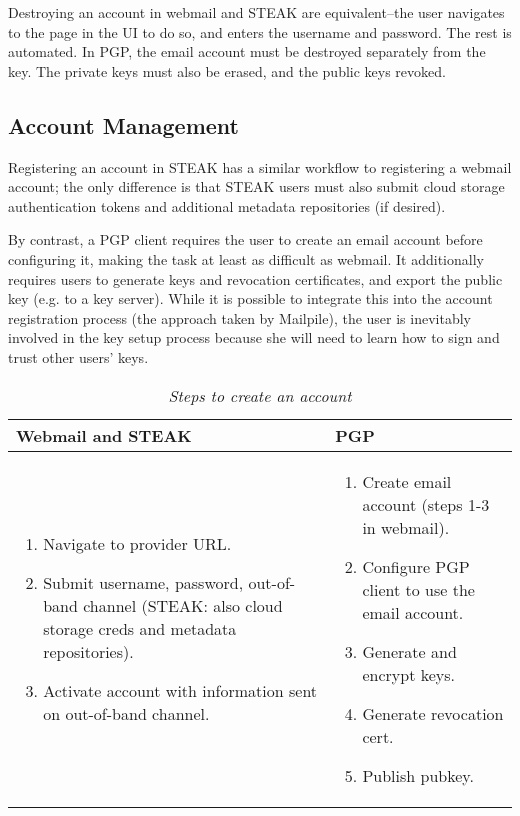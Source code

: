 Destroying an account in webmail and STEAK are equivalent--the user navigates to the page in the UI to do so, and enters the username and password.  The rest is automated.  In PGP, the email account must be destroyed separately from the key.  The private keys must also be erased, and the public keys revoked.

\subsection{Account Management}
Registering an account in STEAK has a similar workflow to registering a webmail account; the only difference is that STEAK users must also submit cloud storage authentication tokens and additional metadata repositories (if desired).

By contrast, a PGP client requires the user to create an email account before configuring it, making the task at least as difficult as webmail.  It additionally requires users to generate keys and revocation certificates, and export the public key (e.g. to a key server).  While it is possible to integrate this into the account registration process (the approach taken by Mailpile), the user is inevitably involved in the key setup process because she will need to learn how to sign and trust other users’ keys. 

\begin{table}[ht!]
\begin{tabular}{ | L{3.5cm} | L{3.5cm} |}
\hline
\textbf{Webmail and STEAK} & \textbf{PGP} \\
\hline
\vspace{-3mm}
\begin{enumerate}
  \item{Navigate to provider URL.}
  \item{Submit username, password, out-of-band channel (STEAK: also cloud storage creds and metadata repositories).} 
  \item{Activate account with information sent on out-of-band channel.}
\end{enumerate} 
\vspace{-\topsep}&

\vspace{-3mm}
\begin{enumerate}
  \item{Create email account (steps 1-3 in webmail).}
  \item{Configure PGP client to use the email account.}
  \item{Generate and encrypt keys.}
  \item{Generate revocation cert.}
  \item{Publish pubkey.}
\end{enumerate} 
\vspace{-\topsep}\\

\hline
\end{tabular}
\caption{\it Steps to create an account}
\label{tab:account-creation}
\end{table}


